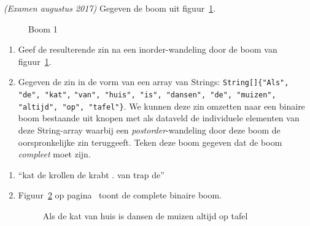 \begin{oef}
\papier \emph{(Examen augustus 2017)} Gegeven de boom uit figuur~\ref{fig:boom1ex}.
\begin{figure}[htbp]
    \centering
{}
\caption{Boom 1}
 \label{fig:boom1ex}
\end{figure}


\begin{enumerate}
\item Geef de resulterende zin na een inorder-wandeling door de boom van figuur~\ref{fig:boom1ex}. 

\item Gegeven de zin in de vorm van een array van Strings:
\verb+String[]{"Als", "de", "kat",+  \verb+"van", "huis", "is", "dansen", "de", "muizen", "altijd", "op", "tafel"}+. 
\newline
We kunnen deze zin omzetten naar een binaire boom bestaande uit knopen met als dataveld de individuele elementen van deze String-array waarbij een \emph{postorder}-wandeling door deze boom de oorspronkelijke zin teruggeeft. Teken deze boom gegeven dat de boom \emph{compleet} moet zijn.


\end{enumerate}
\begin{opl}
\begin{enumerate}
\item “kat de krollen de krabt . van trap de”
\item Figuur~\ref{fig:dansendemuizen} op pagina~\pageref{fig:dansendemuizen} toont de complete binaire boom.
\begin{figure}[htbp] 
    \centering
{}
\caption{Als de kat van huis is dansen de muizen altijd op tafel}
    \label{fig:dansendemuizen}
\end{figure}
\end{enumerate}
\end{opl}
\end{oef}





